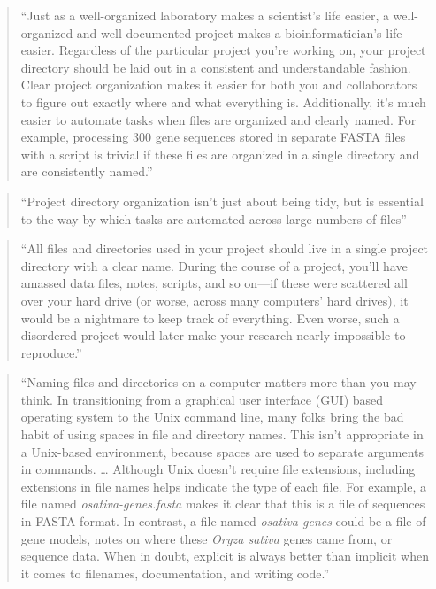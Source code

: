 \documentclass[]{tufte-book}
\begin{document}
\begin{quote}
``Just as a well-organized laboratory makes a scientist's life easier, a well-organized
and well-documented project makes a bioinformatician's life easier. Regardless of the
particular project you're working on, your project directory should be laid out in a
consistent and understandable fashion. Clear project organization makes it easier
for both you and collaborators to figure out exactly where and what everything is.
Additionally, it's much easier to automate tasks when files are organized and
clearly named. For example, processing 300 gene sequences stored in separate FASTA
files with a script is trivial if these files are organized in a single directory and
are consistently named.'' \citep{buffalo2015bioinformatics}
\end{quote}

\begin{quote}
``Project directory organization isn't just about being tidy, but is essential to the
way by which tasks are automated across large numbers of files'' \citep{buffalo2015bioinformatics}
\end{quote}

\begin{quote}
``All files and directories used in your project should live in a single project directory
with a clear name. During the course of a project, you'll have amassed data files, notes,
scripts, and so on---if these were scattered all over your hard drive (or worse, across
many computers' hard drives), it would be a nightmare to keep track of everything. Even
worse, such a disordered project would later make your research nearly impossible to
reproduce.'' \citep{buffalo2015bioinformatics}
\end{quote}

\begin{quote}
``Naming files and directories on a computer matters more than you may think. In
transitioning from a graphical user interface (GUI) based operating system to
the Unix command line, many folks bring the bad habit of using spaces in
file and directory names. This isn't appropriate in a Unix-based environment, because
spaces are used to separate arguments in commands. \ldots{} Although Unix doesn't require
file extensions, including extensions in file names helps indicate the type of each
file. For example, a file named \emph{osativa-genes.fasta} makes it clear that this is
a file of sequences in FASTA format. In contrast, a file named \emph{osativa-genes} could
be a file of gene models, notes on where these \emph{Oryza sativa} genes came from, or
sequence data. When in doubt, explicit is always better than implicit when it comes to
filenames, documentation, and writing code.'' \citep{buffalo2015bioinformatics}
\end{quote}
\end{document}
